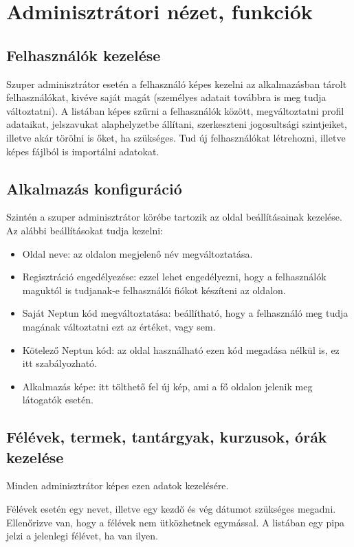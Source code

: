 \documentclass[
]{thesis-ekf}
\theoremstyle{definition}
\theoremstyle{remark}
\begin{document}
\section{Adminisztrátori nézet, funkciók}

\subsection{Felhasználók kezelése}

Szuper adminisztrátor esetén a felhasználó képes kezelni az alkalmazásban tárolt felhasználókat, kivéve saját magát (személyes adatait továbbra is meg tudja változtatni). A listában képes szűrni a felhasználók között, megváltoztatni profil adataikat, jelszavukat alaphelyzetbe állítani, szerkeszteni jogosultsági szintjeiket, illetve akár törölni is őket, ha szükséges. Tud új felhasználókat létrehozni, illetve képes fájlból is importálni adatokat.

\subsection{Alkalmazás konfiguráció}

Szintén a szuper adminisztrátor körébe tartozik az oldal beállításainak kezelése. Az alábbi beállításokat tudja kezelni:
\begin{itemize}
	\item Oldal neve: az oldalon megjelenő név megváltoztatása.
	\item Regisztráció engedélyezése: ezzel lehet engedélyezni, hogy a felhasználók maguktól is tudjanak-e felhasználói fiókot készíteni az oldalon.
	\item Saját Neptun\cite{Neptun} kód megváltoztatása: beállítható, hogy a felhasználó meg tudja magának változtatni ezt az értéket, vagy sem.
	\item Kötelező Neptun kód: az oldal használható ezen kód megadása nélkül is, ez itt szabályozható.
	\item Alkalmazás képe: itt tölthető fel új kép, ami a fő oldalon jelenik meg látogatók esetén.
\end{itemize}

\subsection{Félévek, termek, tantárgyak, kurzusok, órák kezelése}

Minden adminisztrátor képes ezen adatok kezelésére.

Félévek esetén egy nevet, illetve egy kezdő és vég dátumot szükséges megadni. Ellenőrizve van, hogy a félévek nem ütközhetnek egymással. A listában egy pipa jelzi a jelenlegi félévet, ha van ilyen.
\end{document}

